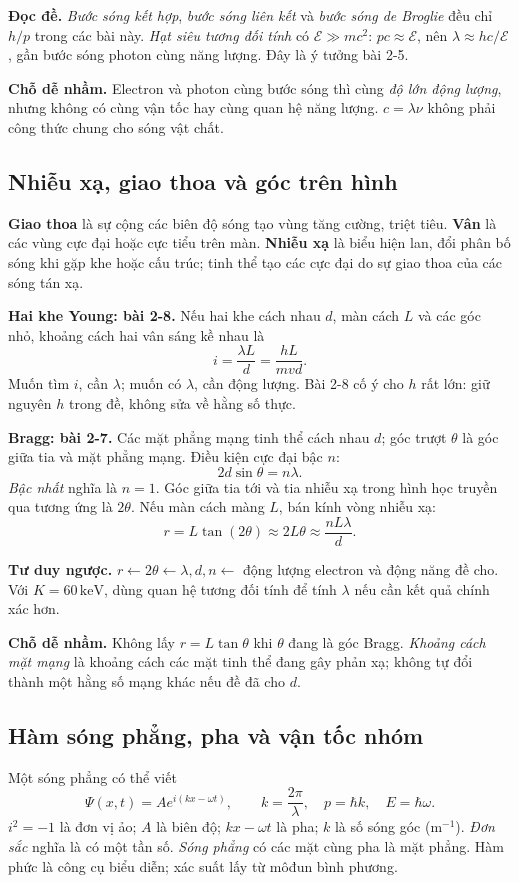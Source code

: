\documentclass[11pt,a4paper]{article}
\newcommand{\unit}[1]{\,\mathrm{#1}}
\newcommand{\readit}[1]{\par\textbf{Đọc đề.} #1\par}
\newcommand{\think}[1]{\par\textbf{Tư duy ngược.} #1\par}
\newcommand{\trap}[1]{\par\textbf{Chỗ dễ nhầm.} #1\par}
\begin{document}
\readit{\emph{Bước sóng kết hợp}, \emph{bước sóng liên kết} và
\emph{bước sóng de Broglie} đều chỉ $h/p$ trong các bài này.
\emph{Hạt siêu tương đối tính} có $\mathcal E\gg mc^2$:
$pc\approx\mathcal E$, nên $\lambda\approx hc/\mathcal E$,
gần bước sóng photon cùng năng lượng. Đây là ý tưởng bài 2-5.}

\trap{Electron và photon cùng bước sóng thì cùng \emph{độ lớn động lượng},
nhưng không có cùng vận tốc hay cùng quan hệ năng lượng.
$c=\lambda\nu$ không phải công thức chung cho sóng vật chất.}

\subsection{Nhiễu xạ, giao thoa và góc trên hình}\label{sec:diffraction}
\textbf{Giao thoa} là sự cộng các biên độ sóng tạo vùng tăng cường, triệt tiêu.
\textbf{Vân} là các vùng cực đại hoặc cực tiểu trên màn.
\textbf{Nhiễu xạ} là biểu hiện lan, đổi phân bố sóng khi gặp khe hoặc cấu trúc;
tinh thể tạo các cực đại do sự giao thoa của các sóng tán xạ.

\textbf{Hai khe Young: bài 2-8.} Nếu hai khe cách nhau $d$, màn cách $L$
và các góc nhỏ, khoảng cách hai vân sáng kề nhau là
\[
i=\frac{\lambda L}{d}=\frac{hL}{mvd}.
\]
Muốn tìm $i$, cần $\lambda$; muốn có $\lambda$, cần động lượng.
Bài 2-8 cố ý cho $h$ rất lớn: giữ nguyên $h$ trong đề, không sửa về hằng số thực.

\textbf{Bragg: bài 2-7.} Các mặt phẳng mạng tinh thể cách nhau $d$;
góc trượt $\theta$ là góc giữa tia và mặt phẳng mạng.
Điều kiện cực đại bậc $n$:
\[
2d\sin\theta=n\lambda.
\]
\emph{Bậc nhất} nghĩa là $n=1$.
Góc giữa tia tới và tia nhiễu xạ trong hình học truyền qua tương ứng là $2\theta$.
Nếu màn cách màng $L$, bán kính vòng nhiễu xạ:
\[
r=L\tan(2\theta)\approx2L\theta\approx\frac{nL\lambda}{d}.
\]
\think{$r\leftarrow2\theta\leftarrow\lambda,d,n
\leftarrow$ động lượng electron và động năng đề cho. Với $K=60\unit{keV}$,
dùng quan hệ tương đối tính để tính $\lambda$ nếu cần kết quả chính xác hơn.}

\trap{Không lấy $r=L\tan\theta$ khi $\theta$ đang là góc Bragg.
\emph{Khoảng cách mặt mạng} là khoảng cách các mặt tinh thể đang gây phản xạ;
không tự đổi thành một hằng số mạng khác nếu đề đã cho $d$.}

\subsection{Hàm sóng phẳng, pha và vận tốc nhóm}\label{sec:phase}
Một sóng phẳng có thể viết
\[
\Psi(x,t)=A e^{i(kx-\omega t)},\qquad
k=\frac{2\pi}{\lambda},\quad p=\hbar k,\quad E=\hbar\omega.
\]
$i^2=-1$ là đơn vị ảo; $A$ là biên độ; $kx-\omega t$ là pha;
$k$ là số sóng góc (m$^{-1}$). \emph{Đơn sắc} nghĩa là có một tần số.
\emph{Sóng phẳng} có các mặt cùng pha là mặt phẳng.
Hàm phức là công cụ biểu diễn; xác suất lấy từ môđun bình phương.
\end{document}
